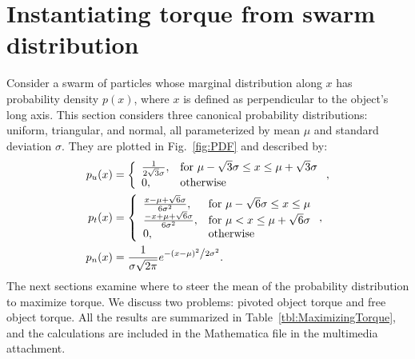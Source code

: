 \section{Instantiating torque from swarm distribution}\label{sec:torqueDist}
%
Consider a swarm of particles whose marginal distribution along $x$ has probability density $p(x)$, where $x$ is defined as perpendicular to the object's long axis.
This section considers three canonical probability distributions: uniform, triangular, and normal, all parameterized by mean $\mu$ and standard deviation $\sigma$. 
They are plotted in Fig.~\ref{fig:PDF} and described by:
%
\begin{align}
p_u(x) &=  \left\{
\begin{array}{ll}
    \frac{1}{2\sqrt{3}\sigma}, &  \textrm{for   } \mu-\sqrt{3}\sigma \leq x \leq \mu+\sqrt{3}\sigma\\
     0, & \textrm{otherwise}\\
\end{array} 
\right. ,\\
p_t(x) &=  \left\{
\begin{array}{ll}
    \frac{x-\mu + \sqrt{6} \sigma}{6\sigma^2}, &  \textrm{for   } \mu-\sqrt{6}\sigma \leq x \leq \mu\\
     \frac{-x+\mu + \sqrt{6} \sigma}{6\sigma^2}, &  \textrm{for   } \mu < x \leq \mu+ \sqrt{6}\sigma\\
     0, & \textrm{otherwise}\\
\end{array} 
\right. ,\\
p_n(x) &= \frac{1}{{\sigma \sqrt {2\pi } }}e^{{{ - \left( {x - \mu } \right)^2 } \mathord{\left/ {\vphantom {{ - \left( {x - \mu } \right)^2 } {2\sigma ^2 }}} \right. \kern-\nulldelimiterspace} {2\sigma ^2 }}}.
\end{align}
The next sections examine where to steer the mean of the probability distribution to maximize torque. We discuss two problems: pivoted object torque and free object torque. All the results are summarized in Table~\ref{tbl:MaximizingTorque}, and the calculations are included in the Mathematica file in the multimedia attachment.
%








